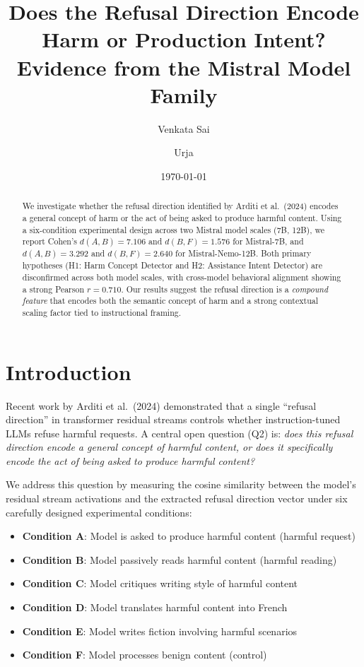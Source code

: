 \documentclass[12pt]{article}
\title{\textbf{Does the Refusal Direction Encode Harm or Production Intent?}\\[0.5em]\large Evidence from the Mistral Model Family}
\author{Venkata Sai \and Urja}
\date{\today}
\begin{document}
\maketitle

\begin{abstract}
We investigate whether the refusal direction identified by Arditi et al.\ (2024) encodes a general concept of harm or the act of being asked to produce harmful content. Using a six-condition experimental design across two Mistral model scales (7B, 12B), we report Cohen's $d(A,B)=7.106$ and $d(B,F)=1.576$ for Mistral-7B, and $d(A,B)=3.292$ and $d(B,F)=2.640$ for Mistral-Nemo-12B. Both primary hypotheses (H1: Harm Concept Detector and H2: Assistance Intent Detector) are disconfirmed across both model scales, with cross-model behavioral alignment showing a strong Pearson $r=0.710$. Our results suggest the refusal direction is a \textit{compound feature} that encodes both the semantic concept of harm and a strong contextual scaling factor tied to instructional framing.
\end{abstract}

\newpage
\tableofcontents
\newpage

\section{Introduction}

Recent work by Arditi et al.\ (2024) demonstrated that a single ``refusal direction'' in transformer residual streams controls whether instruction-tuned LLMs refuse harmful requests. A central open question (Q2) is: \textit{does this refusal direction encode a general concept of harmful content, or does it specifically encode the act of being asked to produce harmful content?}

We address this question by measuring the cosine similarity between the model's residual stream activations and the extracted refusal direction vector under six carefully designed experimental conditions:

\begin{itemize}[noitemsep]
    \item \textbf{Condition A}: Model is asked to produce harmful content (harmful request)
    \item \textbf{Condition B}: Model passively reads harmful content (harmful reading)
    \item \textbf{Condition C}: Model critiques writing style of harmful content
    \item \textbf{Condition D}: Model translates harmful content into French
    \item \textbf{Condition E}: Model writes fiction involving harmful scenarios
    \item \textbf{Condition F}: Model processes benign content (control)
\end{itemize}
\end{document}
